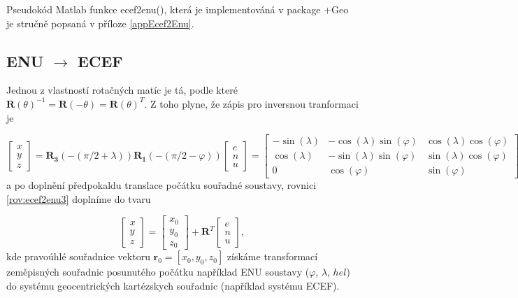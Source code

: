 \documentclass[11pt,a4paper]{article}
\begin{document}
Pseudokód Matlab funkce ecef2enu(), která je implementováná v package +Geo je stručně popsaná v příloze \ref{appEcef2Enu}.


\subsection{ENU $\rightarrow$ ECEF}


Jednou z vlastností rotačných matíc je tá, podle které $\mathbf{R}\left(\theta\right)^{-1} = \mathbf{R}\left(-\theta\right) = \mathbf{R}\left(\theta\right)^{T}$. Z toho plyne, že zápis pro inversnou tranformaci je

\begin{equation}
\begin{bmatrix}
x \\
y \\
z
\end{bmatrix} =
\mathbf{R_{3}}\left(-\left(\pi/2+\lambda\right)\right)\mathbf{R_{1}}\left(-\left(\pi/2-\varphi\right)\right)
\begin{bmatrix}
e \\
n \\
u
\end{bmatrix} = 
\begin{bmatrix}
-\sin{\left(\lambda\right)} & -\cos{\left(\lambda\right)}\sin{\left(\varphi\right)} & \cos{\left(\lambda\right)}\cos{\left(\varphi\right)} \\
 \cos{\left(\lambda\right)} & -\sin{\left(\lambda\right)}\sin{\left(\varphi\right)} & \sin{\left(\lambda\right)}\cos{\left(\varphi\right)} \\
 0  &  \cos{\left(\varphi\right)} & \sin{\left(\varphi\right)} 
\end{bmatrix}
\begin{bmatrix}
e \\
n \\
u
\end{bmatrix}.
\label{rov:ecef2enu3}
\end{equation}
a po doplnění předpokaldu translace počátku souřadné soustavy, rovnici \ref{rov:ecef2enu3} doplníme do tvaru

\begin{equation}
\begin{bmatrix}
x \\
y \\
z
\end{bmatrix} =
\begin{bmatrix}
x_{0} \\
y_{0} \\
z_{0}
\end{bmatrix} + 
\mathbf{R}^{T}
\begin{bmatrix}
e \\
n \\
u
\end{bmatrix},
\label{rov:ecef2enu33}
\end{equation}
kde pravoúhlé souřadnice vektoru $\mathbf{r}_{0}=\left[x_{0}, y_{0}, z_{0} \right]$ získáme transformací zeměpisných souřadnic posunutého počátku například ENU soustavy ($\varphi$, $\lambda$, $hel$) do systému geocentrických kartézskych souřadnic (například systému ECEF).
\end{document}
